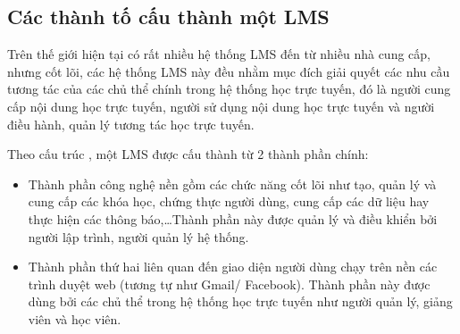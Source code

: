 \subsection{Các thành tố cấu thành một LMS}
{Trên thế giới hiện tại có rất nhiều hệ thống LMS đến từ nhiều nhà cung cấp, nhưng cốt lõi, các hệ thống LMS này đều nhằm mục đích giải quyết các nhu cầu tương tác của các chủ thể chính trong hệ thống học trực tuyến, đó là người cung cấp nội dung học trực tuyến, người sử dụng nội dung học trực tuyến và người điều hành, quản lý tương tác học trực tuyến.}

{Theo cấu trúc \cite{lms}, một LMS được cấu thành từ 2 thành phần chính:}
\begin{itemize}
	\item Thành phần công nghệ nền gồm các chức năng cốt lõi như tạo, quản lý và cung cấp các khóa học, chứng thực người dùng, cung cấp các dữ liệu hay thực hiện các thông báo,…Thành phần này được quản lý và điều khiển bởi người lập trình, người quản lý hệ thống.
	\item Thành phần thứ hai liên quan đến giao diện người dùng chạy trên nền các trình duyệt web (tương tự như Gmail/ Facebook). Thành phần này được dùng bởi các chủ thể trong hệ thống học trực tuyến như người quản lý, giảng viên và học viên.
\end{itemize}

